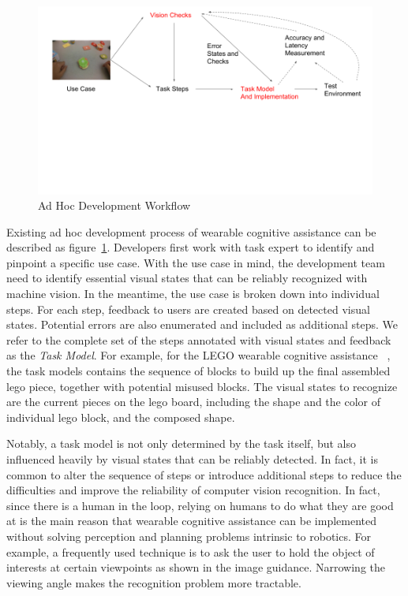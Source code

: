 \begin{figure}
  \centering
  \includegraphics[trim={0 6cm 0 0},width=\linewidth]{FIGS/ad-hoc-workflow}
	\caption{Ad Hoc Development Workflow}
    \label{figs:workflow}
\end{figure}

Existing ad hoc development process of wearable cognitive assistance can be
described as figure~\ref{figs:workflow}. Developers first work with task expert
to identify and pinpoint a specific use case. With the use case in mind, the
development team need to identify essential visual states that can be reliably
recognized with machine vision. In the meantime, the use case is broken down
into individual steps. For each step, feedback to users are created based on
detected visual states. Potential errors are also enumerated and included as
additional steps. We refer to the complete set of the steps annotated with
visual states and feedback as the \textit{Task Model}. For example, for the LEGO
wearable cognitive assistance ~\cite{chen2017empirical}, the task models
contains the sequence of blocks to build up the final assembled lego piece,
together with potential misused blocks. The visual states to recognize are the
current pieces on the lego board, including the shape and the color of
individual lego block, and the composed shape.

Notably, a task model is not only determined by the task itself, but also
influenced heavily by visual states that can be reliably detected. In fact, it
is common to alter the sequence of steps or introduce additional steps to reduce
the difficulties and improve the reliability of computer vision recognition. In
fact, since there is a human in the loop, relying on humans to do what they are
good at is the main reason that wearable cognitive assistance can be implemented
without solving perception and planning problems intrinsic to robotics. For
example, a frequently used technique is to ask the user to hold the object of
interests at certain viewpoints as shown in the image guidance. Narrowing the
viewing angle makes the recognition problem more tractable.

